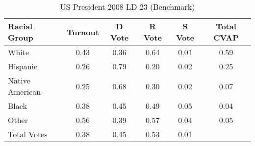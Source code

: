 \begin{table}[htb]
\begin{center}
\caption{US President 2008 LD 23 (Benchmark)}
\label{pres08_cvap_ld_23_benchmark}
\begin{tabular}{lccccc}
  \hline
Racial Group & Turnout & D Vote & R Vote & S Vote & Total CVAP \\ 
  \hline
White & 0.43 & 0.36 & 0.64 & 0.01 & 0.59 \\ 
  Hispanic & 0.26 & 0.79 & 0.20 & 0.02 & 0.25 \\ 
  Native American & 0.25 & 0.68 & 0.30 & 0.02 & 0.07 \\ 
  Black & 0.38 & 0.45 & 0.49 & 0.05 & 0.04 \\ 
  Other & 0.56 & 0.39 & 0.57 & 0.04 & 0.05 \\ 
  Total Votes & 0.38 & 0.45 & 0.53 & 0.01 &  \\ 
   \hline
\end{tabular}
\end{center}
\end{table}
